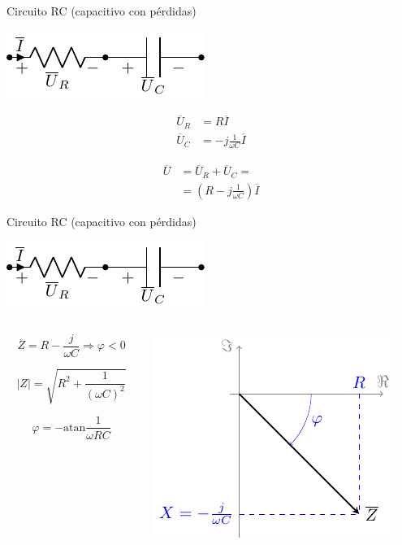 \documentclass[aspectratio=169, usenames,svgnames,dvipsnames]{beamer}
\newcommand{\atan}{\mathrm{atan}}
\begin{document}
\begin{frame}[label={sec:org2ba7cfe}]{Circuito RC (capacitivo con pérdidas)}
\begin{center}
\includegraphics[height=0.2\textheight]{../figs/RC.pdf}
\end{center}

\begin{align*}
  \overline{U}_R &= R \overline{I}\\
  \overline{U}_C &= -j \frac{1}{\omega C} \overline{I}
\end{align*}

\begin{align*}
  \overline{U} &= \overline{U}_R + \overline{U}_C =\\
               &= (R - j \frac{1}{\omega C}) \overline{I} 
\end{align*}
\end{frame}
\begin{frame}[label={sec:orgdab6d61}]{Circuito RC (capacitivo con pérdidas)}
\begin{center}
\includegraphics[height=0.2\textheight]{../figs/RC.pdf}
\end{center}

\begin{columns}
\begin{column}{0.45\columnwidth}
\[
\overline{Z} = R - \frac{j}{\omega C} \Rightarrow \boxed{\varphi < 0}
\]

\[
  |Z| = \sqrt{R^2 + \frac{1}{(\omega C)^2}}
\]

\[
  \varphi = - \atan{\frac{1}{\omega R C}}
\]
\end{column}

\begin{column}{0.55\columnwidth}
\begin{center}
\includegraphics[height=0.45\textheight]{../figs/fasorCondensadorReal.pdf}
\end{center}
\end{column}
\end{columns}
\end{frame}
\end{document}
